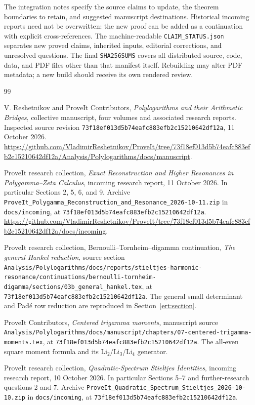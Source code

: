 \documentclass[11pt,a4paper]{article}
\numberwithin{equation}{section}
\theoremstyle{plain}
\theoremstyle{definition}
\theoremstyle{remark}
\newcommand{\src}[1]{\nolinkurl{#1}}
\newcommand{\sourcepin}{\texttt{73f18ef013d5b74eafc883efb2c15210642df12a}}
\begin{document}
The integration notes specify the source claims to update, the theorem
boundaries to retain, and suggested manuscript destinations.  Historical
incoming reports need not be overwritten: the new proof can be added
as a continuation with explicit cross-references.  The machine-readable
\src{CLAIM_STATUS.json} separates new proved claims, inherited inputs,
editorial corrections, and unresolved questions.  The final
\src{SHA256SUMS} covers all distributed source, code, data, and PDF
files other than that manifest itself.  Rebuilding may alter PDF
metadata; a new build should receive its own rendered review.



\begin{thebibliography}{99}

V. Reshetnikov and ProveIt Contributors,
\emph{Polylogarithms and their Arithmetic Bridges}, collective manuscript,
four volumes and associated research reports.  Inspected source revision
\sourcepin, 11 October 2026.
\url{https://github.com/VladimirReshetnikov/ProveIt/tree/73f18ef013d5b74eafc883efb2c15210642df12a/Analysis/Polylogarithms/docs/manuscript}.

ProveIt research collection,
\emph{Exact Reconstruction and Higher Resonances in Polygamma--Zeta Calculus}, incoming research report,
11 October 2026.  In particular Sections 2, 5, 6, and 9.
Archive \src{ProveIt_Polygamma_Reconstruction_and_Resonance_2026-10-11.zip}
in \src{docs/incoming}, at \sourcepin.
\url{https://github.com/VladimirReshetnikov/ProveIt/tree/73f18ef013d5b74eafc883efb2c15210642df12a/docs/incoming}.

ProveIt research collection, Bernoulli--Tornheim--digamma continuation,
\emph{The general Hankel reduction}, source section
\src{Analysis/Polylogarithms/docs/reports/stieltjes-harmonic-resonance/continuations/bernoulli-tornheim-digamma/sections/03b_general_hankel.tex},
at \sourcepin.  The general small determinant and Pad\'e row
reduction are reproduced in Section~\ref{ert:section}.

ProveIt Contributors, \emph{Centered trigamma moments}, manuscript source
\src{Analysis/Polylogarithms/docs/manuscript/chapters/07-centered-trigamma-moments.tex},
at \sourcepin.  The all-even square moment formula and its
Li$_2$/Li$_3$/Li$_4$ generator.

ProveIt research collection, \emph{Quadratic-Spectrum Stieltjes
Identities}, incoming research report, 10 October 2026.  In particular
Sections 5--7 and further-research questions 2 and 7.
Archive \src{ProveIt_Quadratic_Spectrum_Stieltjes_2026-10-10.zip}
in \src{docs/incoming}, at \sourcepin.


\end{thebibliography}
\end{document}
